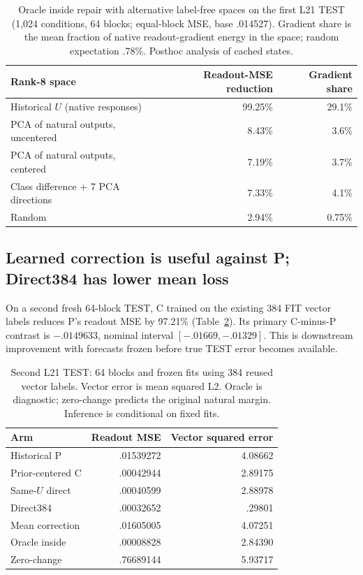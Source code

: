 \documentclass[11pt]{article}
\begin{document}
\begin{table}[ht]\centering\small
\begin{tabular}{lrr}\toprule Rank-8 space & Readout-MSE reduction & Gradient share\\\midrule
Historical $U$ (native responses) & 99.25\% & 29.1\%\\
PCA of natural outputs, uncentered & 8.43\% & 3.6\%\\
PCA of natural outputs, centered & 7.19\% & 3.7\%\\
Class difference + 7 PCA directions & 7.33\% & 4.1\%\\
Random & 2.94\% & 0.75\%\\\bottomrule\end{tabular}
\caption{Oracle inside repair with alternative label-free spaces on the first L21 TEST (1,024 conditions, 64 blocks; equal-block MSE, base .014527). Gradient share is the mean fraction of native readout-gradient energy in the space; random expectation .78\%. Posthoc analysis of cached states.}\label{tab:spaces}
\end{table}

\subsection{Learned correction is useful against P; Direct384 has lower mean loss}
On a second fresh 64-block TEST, C trained on the existing 384 FIT vector labels reduces P's readout MSE by 97.21\% (Table~\ref{tab:learned}). Its primary C-minus-P contrast is $-.0149633$, nominal interval $[-.01669,-.01329]$. This is downstream improvement with forecasts frozen before true TEST error becomes available.

\begin{table}[ht]\centering\small
\begin{tabular}{lrr}\toprule Arm & Readout MSE & Vector squared error\\\midrule
Historical P & .01539272 & 4.08662\\
Prior-centered C & .00042944 & 2.89175\\
Same-$U$ direct & .00040599 & 2.88978\\
Direct384 & .00032652 & .29801\\
Mean correction & .01605005 & 4.07251\\
Oracle inside & .00008828 & 2.84390\\
Zero-change & .76689144 & 5.93717\\\bottomrule\end{tabular}
\caption{Second L21 TEST: 64 blocks and frozen fits using 384 reused vector labels. Vector error is mean squared L2. Oracle is diagnostic; zero-change predicts the original natural margin. Inference is conditional on fixed fits.}\label{tab:learned}
\end{table}
\end{document}
